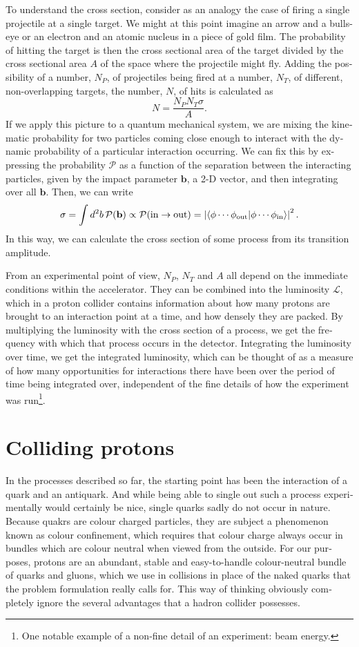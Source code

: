 \begin{english}
To understand the cross section, consider as an analogy the case of firing a single projectile at a single target. We might at this point imagine an arrow and a bulls-eye or an electron and an atomic nucleus in a piece of gold film. The probability of hitting the target is then the cross sectional area of the target divided by the cross sectional area $A$ of the space where the projectile might fly. Adding the possibility of a number, $N_P$, of projectiles being fired at a number, $N_T$, of different, non-overlapping targets, the number, $N$, of hits is calculated as
\[N=\frac{N_P N_T \sigma}{A}.\]
If we apply this picture to a quantum mechanical system, we are mixing the kinematic probability for two particles coming close enough to interact with the dynamic probability of a particular interaction occurring. We can fix this by expressing the probability $\mathcal P$ as a function of the separation between the interacting particles, given by the impact parameter $\mathbf b$, a 2-D vector, and then integrating over all $\mathbf b$. Then, we can write
\[\sigma=\int d^2b\,\mathcal P(\mathbf b)\propto\mathcal P(\text{in}\rightarrow\text{out})=\left|\left\langle\phi\cdots\phi_\text{out}\middle|\phi\cdots\phi_\text{in}\right\rangle\right|^2.\]
In this way, we can calculate the cross section of some process from its transition amplitude.

From an experimental point of view, $N_P$, $N_T$ and $A$ all depend on the immediate conditions within the accelerator. They can be combined into the luminosity $\mathscr L$, which in a proton collider contains information about how many protons are brought to an interaction point at a time, and how densely they are packed. By multiplying the luminosity with the cross section of a process, we get the frequency with which that process occurs in the detector. Integrating the luminosity over time, we get the integrated luminosity, which can be thought of as a measure of how many opportunities for interactions there have been over the period of time being integrated over, independent of the fine details of how the experiment was run\footnote{One notable example of a non-fine detail of an experiment: beam energy.}.

\section{Colliding protons \label{sec.pdfth}}
In the processes described so far, the starting point has been the interaction of a quark and an antiquark. And while being able to single out such a process experimentally would certainly be nice, single quarks sadly do not occur in nature. Because quakrs are colour charged particles, they are subject a phenomenon known as colour confinement, which requires that colour charge always occur in bundles which are colour neutral when viewed from the outside. For our purposes, protons are an abundant, stable and easy-to-handle colour-neutral bundle of quarks and gluons, which we use in collisions in place of the naked quarks that the problem formulation really calls for. This way of thinking obviously completely ignore the several advantages that a hadron collider possesses.


\end{english}

